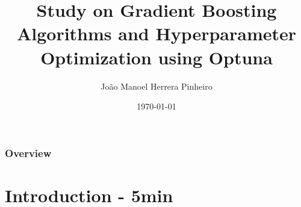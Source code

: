 \documentclass{beamer}
\title[GBMs Optimization using Optuna]{Study on Gradient Boosting Algorithms and
Hyperparameter Optimization using Optuna} %
\author{João Manoel Herrera Pinheiro} %
\institute[EESC] %
{
University of São Paulo \\ %
\medskip
\textit{joaomh@protonmail.com} %
}
\date{\today} %
\begin{document}
\begin{frame}
\titlepage %
\end{frame}

\begin{frame}
\frametitle{Overview} %
\tableofcontents %
\end{frame}


\section{Introduction - 5min} %
\end{document}
